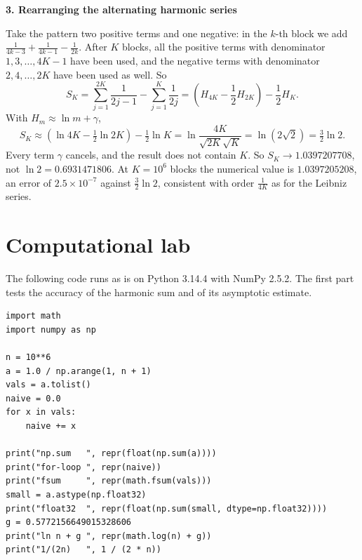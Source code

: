 \medskip\noindent\textbf{3. Rearranging the alternating harmonic series}

Take the pattern two positive terms and one negative: in the $k$-th block we add
$\frac{1}{4k-3} + \frac{1}{4k-1} - \frac{1}{2k}$. After $K$ blocks, all the positive terms
with denominator $1, 3, \ldots, 4K-1$ have been used, and the negative terms with
denominator $2, 4, \ldots, 2K$ have been used as well. So
\[
  S_K = \sum_{j=1}^{2K} \frac{1}{2j-1} - \sum_{j=1}^{K} \frac{1}{2j}
      = \left( H_{4K} - \frac{1}{2}H_{2K} \right) - \frac{1}{2}H_K .
\]
With $H_m \approx \ln m + \gamma$,
\[
  S_K \approx \left(\ln 4K - \tfrac{1}{2}\ln 2K\right) - \tfrac{1}{2}\ln K
  = \ln \frac{4K}{\sqrt{2K}\sqrt{K}} = \ln\left(2\sqrt{2}\right) = \tfrac{3}{2}\ln 2 .
\]
Every term $\gamma$ cancels, and the result does not contain $K$. So
$S_K \to 1.0397207708$, not $\ln 2 = 0.6931471806$. At $K = 10^6$ blocks the numerical
value is $1.0397205208$, an error of $2.5 \times 10^{-7}$ against $\tfrac{3}{2}\ln 2$,
consistent with order $\frac{1}{4K}$ as for the Leibniz series.


\section{Computational lab}

The following code runs as is on Python 3.14.4 with NumPy 2.5.2. The first part tests the
accuracy of the harmonic sum and of its asymptotic estimate.

\begin{lab}
\begin{verbatim}
import math
import numpy as np

n = 10**6
a = 1.0 / np.arange(1, n + 1)
vals = a.tolist()
naive = 0.0
for x in vals:
    naive += x

print("np.sum   ", repr(float(np.sum(a))))
print("for-loop ", repr(naive))
print("fsum     ", repr(math.fsum(vals)))
small = a.astype(np.float32)
print("float32  ", repr(float(np.sum(small, dtype=np.float32))))
g = 0.5772156649015328606
print("ln n + g ", repr(math.log(n) + g))
print("1/(2n)   ", 1 / (2 * n))
\end{verbatim}
\end{lab}

